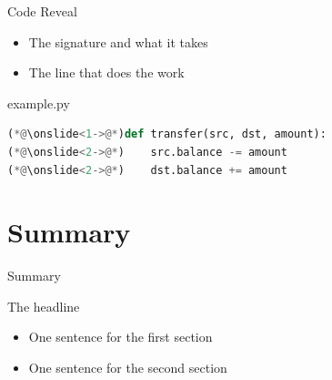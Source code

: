 \begin{frame}[fragile]{Code Reveal}
  \begin{itemize}
    \item<1-> The signature and what it takes
    \item<2-> The line that does the work
  \end{itemize}
  \vspace{0.3cm}
  \begin{codeblock}{example.py}
\begin{lstlisting}[style=reveal, language=Python]
(*@\onslide<1->@*)def transfer(src, dst, amount):
(*@\onslide<2->@*)    src.balance -= amount
(*@\onslide<2->@*)    dst.balance += amount
\end{lstlisting}
  \end{codeblock}
\end{frame}

\section{Summary}

\begin{frame}{Summary}
  \begin{block}{The headline}
    \begin{itemize}
      \item One sentence for the first section
      \item One sentence for the second section
    \end{itemize}
  \end{block}
\end{frame}

\makeclosingframe


